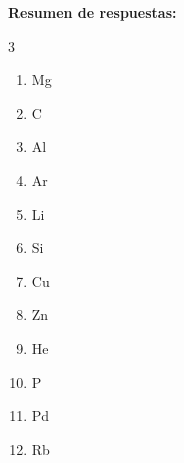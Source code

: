 \begin{exercise}
\begin{solu}
        \textbf{Resumen de respuestas:}
        \begin{multicols}{3}
            \begin{enumerate}[label=\letraminuscula]
                \item Mg
                \item C
                \item Al
                \item Ar
                \item Li
                \item Si
                \item Cu
                \item Zn
                \item He
                \item P
                \item Pd
                \item Rb
            \end{enumerate}
        \end{multicols}
    \end{solu}
\end{exercise}

